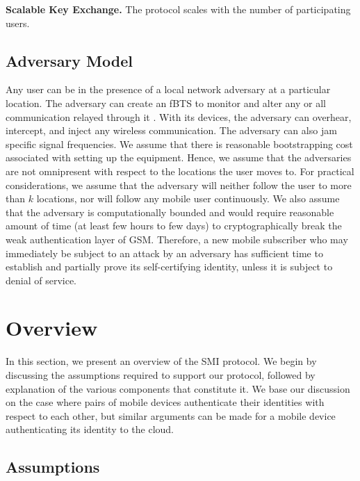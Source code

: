 \documentclass[letterpaper,twocolumn]{sig-alternate}
\begin{document}
\textbf{Scalable Key Exchange.} The protocol scales with the number of participating users. 

\subsection{Adversary Model}
\label{admodel}

Any user can be in the presence of a local network adversary at a particular location. The adversary can create an fBTS to monitor and alter any or all communication relayed through it \cite{stхhlberg2000radio}. With its devices, the adversary can overhear, intercept, and inject any wireless communication. The adversary can also jam specific signal frequencies. We assume that there is reasonable bootstrapping cost associated with setting up the equipment. Hence, we assume that the adversaries are not omnipresent with respect to the locations the user moves to. For practical considerations, we assume that the adversary will neither follow the user to more than $k$ locations, nor will follow any mobile user continuously. We also assume that the adversary is computationally bounded and would require reasonable amount of time (at least few hours \cite{dunkelman2010practical} to few days) to cryptographically break the weak authentication layer of GSM. Therefore, a new mobile subscriber who may immediately be subject to an attack by an adversary has sufficient time to establish and partially prove its self-certifying identity, unless it is subject to denial of service.

 \section{Overview}
\label{smprot}

In this section, we present an overview of the SMI protocol. We begin by discussing the assumptions required to support our protocol, followed by explanation of the various components that constitute it. We base our discussion on the case where pairs of mobile devices authenticate their identities with respect to each other, but similar arguments can be made for a mobile device authenticating its identity to the cloud.
 
\subsection{Assumptions}
\label{powt}
\end{document}
